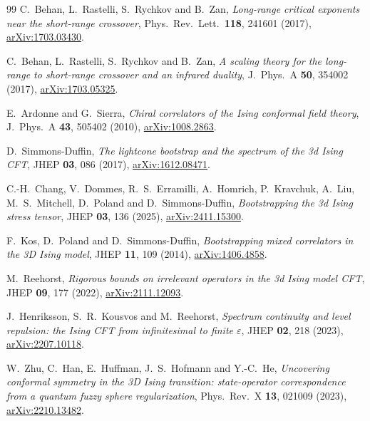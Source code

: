 \begin{thebibliography}{99}
C.~Behan, L.~Rastelli, S.~Rychkov and B.~Zan,
\emph{Long-range critical exponents near the short-range crossover},
Phys.\ Rev.\ Lett.\ \textbf{118}, 241601 (2017),
\href{https://arxiv.org/abs/1703.03430}{arXiv:1703.03430}.

C.~Behan, L.~Rastelli, S.~Rychkov and B.~Zan,
\emph{A scaling theory for the long-range to short-range crossover and an infrared duality},
J.\ Phys.\ A \textbf{50}, 354002 (2017),
\href{https://arxiv.org/abs/1703.05325}{arXiv:1703.05325}.

E.~Ardonne and G.~Sierra,
\emph{Chiral correlators of the Ising conformal field theory},
J.\ Phys.\ A \textbf{43}, 505402 (2010),
\href{https://arxiv.org/abs/1008.2863}{arXiv:1008.2863}.

D.~Simmons-Duffin,
\emph{The lightcone bootstrap and the spectrum of the 3d Ising CFT},
JHEP \textbf{03}, 086 (2017),
\href{https://arxiv.org/abs/1612.08471}{arXiv:1612.08471}.

C.-H.~Chang, V.~Dommes, R.~S.~Erramilli, A.~Homrich, P.~Kravchuk, A.~Liu, M.~S.~Mitchell, D.~Poland and
D.~Simmons-Duffin, \emph{Bootstrapping the 3d Ising stress tensor},
JHEP \textbf{03}, 136 (2025),
\href{https://arxiv.org/abs/2411.15300}{arXiv:2411.15300}.

F.~Kos, D.~Poland and D.~Simmons-Duffin,
\emph{Bootstrapping mixed correlators in the 3D Ising model},
JHEP \textbf{11}, 109 (2014),
\href{https://arxiv.org/abs/1406.4858}{arXiv:1406.4858}.

M.~Reehorst,
\emph{Rigorous bounds on irrelevant operators in the 3d Ising model CFT},
JHEP \textbf{09}, 177 (2022),
\href{https://arxiv.org/abs/2111.12093}{arXiv:2111.12093}.

J.~Henriksson, S.~R.~Kousvos and M.~Reehorst,
\emph{Spectrum continuity and level repulsion: the Ising CFT from infinitesimal to finite $\varepsilon$},
JHEP \textbf{02}, 218 (2023),
\href{https://arxiv.org/abs/2207.10118}{arXiv:2207.10118}.

W.~Zhu, C.~Han, E.~Huffman, J.~S.~Hofmann and Y.-C.~He,
\emph{Uncovering conformal symmetry in the 3D Ising transition: state-operator correspondence from a quantum fuzzy
sphere regularization}, Phys.\ Rev.\ X \textbf{13}, 021009 (2023),
\href{https://arxiv.org/abs/2210.13482}{arXiv:2210.13482}.


\end{thebibliography}
